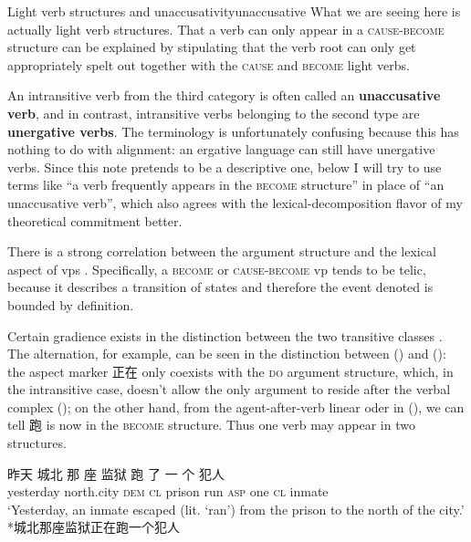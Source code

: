 \documentclass[UTF8, a4paper, oneside, scheme=plain, 12pt]{ctexrep}
\newcommand*{\concept}[1]{\textbf{#1}}
\newcommand{\translate}[1]{`#1'}
\newcommand*{\category}[1]{\textsc{#1}}
\begin{document}
\begin{theorybox}{Light verb structures and unaccusativity}{unaccusative}
    What we are seeing here is actually light verb structures.
    That a verb can only appear in a \category{cause-become} structure 
    can be explained by stipulating that 
    the verb root can only get appropriately spelt out
    together with the \category{cause} and \category{become} light verbs. 

    An intransitive verb from the third category
    is often called an \concept{unaccusative verb}, 
    and in contrast, 
    intransitive verbs belonging to the second type 
    are \concept{unergative verbs}.
    The terminology is unfortunately confusing
    because this has nothing to do with alignment:
    an ergative language can still have unergative verbs.
    Since this note pretends to be a descriptive one, 
    below I will try to use terms like ``a verb frequently appears in the \category{become} structure''
    in place of ``an unaccusative verb'',
    which also agrees with the lexical-decomposition flavor of 
    my theoretical commitment better. 
\end{theorybox}

There is a strong correlation between the argument structure 
and the lexical aspect of \acs{vp}s
\citep{laws2010core,toratani1997typology,aljovic2000unaccusativity}.
Specifically, a \category{become} or \category{cause}-\category{become} \acs{vp}
tends to be telic, 
because it describes a transition of states 
and therefore the event denoted is bounded by definition.

Certain gradience exists in the distinction between the two transitive classes
\citep{lin2021unaccusativity,huang2007}. 
The alternation, for example, can be seen in the distinction
between () 
and ():
the aspect marker 正在 only coexists with the \category{do} argument structure,
which, in the intransitive case, 
doesn't allow the only argument to reside after the verbal complex
();
on the other hand, from the agent-after-verb linear oder in 
(),
we can tell 跑 is now in the \category{become} structure.
Thus one verb may appear in two structures.


\begin{exe}
    \ex\label{ex:verb-phrase.overview.1} \gll 昨天 城北 那 座 监狱 跑 了 一 个 犯人 \\
    yesterday north.city \category{dem} \category{cl} prison run \category{asp} one \category{cl} inmate \\
    \glt \translate{Yesterday, an inmate escaped (lit. `ran') from the prison to the north of the city.} 
    \ex\label{ex:verb-phrase.overview.2} *城北那座监狱正在跑一个犯人
\end{exe}
\end{document}
